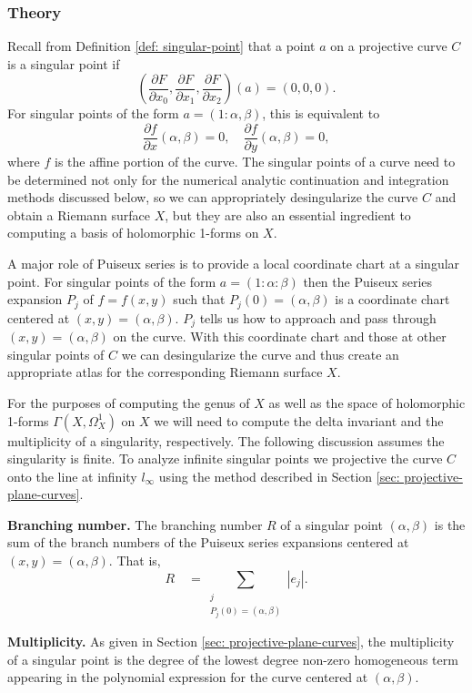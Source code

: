 %
\subsubsection*{Theory}
%

Recall from Definition \ref{def: singular-point} that a point $a$ on a
projective curve $C$ is a singular point if
\[
    \left(
      \frac{\partial F}{\partial x_0},
      \frac{\partial F}{\partial x_1},
      \frac{\partial F}{\partial x_2}
    \right) (a)
    = (0,0,0).
\]
For singular points of the form $a = (1 : \alpha, \beta)$, this is
equivalent to
\[
    \frac{\partial f}{\partial x} (\alpha,\beta) = 0, \quad
    \frac{\partial f}{\partial y} (\alpha,\beta) = 0,
\]
where $f$ is the affine portion of the curve. The singular points of a
curve need to be determined not only for the numerical analytic
continuation and integration methods discussed below, so we can
appropriately desingularize the curve $C$ and obtain a Riemann surface
$X$, but they are also an essential ingredient to computing a basis of
holomorphic 1-forms on $X$.

A major role of Puiseux series is to provide a local coordinate chart at
a singular point. For singular points of the form $a = (1 : \alpha :
\beta)$ then the Puiseux series expansion $P_j$ of $f = f(x,y)$ such
that $P_j(0) = (\alpha, \beta)$ is a coordinate chart centered at $(x,y)
= (\alpha, \beta)$. $P_j$ tells us how to approach and pass through
$(x,y) = (\alpha, \beta)$ on the curve. With this coordinate chart and
those at other singular points of $C$ we can desingularize the curve and
thus create an appropriate atlas for the corresponding Riemann surface
$X$.

For the purposes of computing the genus of $X$ as well as the space of
holomorphic 1-forms $\Gamma(X,\Omega_X^1)$ on $X$ we will need to
compute the delta invariant and the multiplicity of a singularity,
respectively. The following discussion assumes the singularity is
finite. To analyze infinite singular points we projective the curve $C$
onto the line at infinity $l_\infty$ using the method described in
Section \ref{sec: projective-plane-curves}.

{\bf Branching number.} The branching number $R$ of a singular point
$(\alpha,\beta)$ is the sum of the branch numbers of the Puiseux series
expansions centered at $(x,y) = (\alpha,\beta)$. That is,
\[
    R \quad = \sum_{\substack{j \\ P_j(0)=(\alpha,\beta)}} |e_j|.
\]

{\bf Multiplicity.} As given in Section \ref{sec:
  projective-plane-curves}, the multiplicity of a singular point is the
degree of the lowest degree non-zero homogeneous term appearing in the
polynomial expression for the curve centered at $(\alpha, \beta)$.

